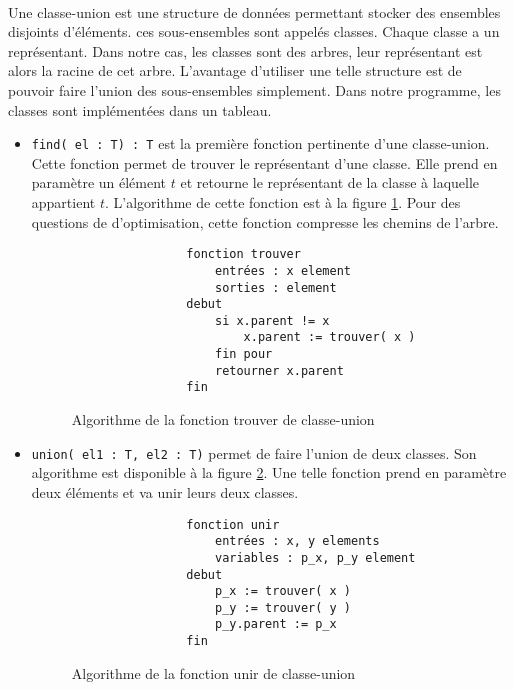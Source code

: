 \documentclass[a4paper]{article}
\begin{document}
		    \paragraph{}{
		    Une classe-union est une structure de données permettant stocker des ensembles disjoints d'éléments. ces sous-ensembles sont 
		    appelés classes. Chaque classe a un représentant. Dans notre cas, les classes sont des arbres, leur représentant est alors
		    la racine de cet arbre. L'avantage d'utiliser une telle structure est de pouvoir faire l'union des
		    sous-ensembles simplement. Dans notre programme, les classes sont implémentées dans un tableau.
		    }
		    \begin{itemize}
			    \item \verb|find( el : T) : T| est la première fonction pertinente d'une classe-union. Cette fonction permet de trouver 
	    	le représentant d'une classe. Elle prend en paramètre un élément $t$ et retourne le représentant de la classe à
	    	laquelle appartient $t$.
	    	L'algorithme de cette fonction est à la figure \ref{algo_find}. Pour des questions de d'optimisation, cette fonction
	    	compresse les chemins de l'arbre.
	    	
	    	\begin{figure}
	    	    \begin{verbatim}
	    	    fonction trouver
	    	        entrées : x element
	    	        sorties : element
	    	    debut
	    	        si x.parent != x
	    	            x.parent := trouver( x )
	    	        fin pour
	    	        retourner x.parent
	    	    fin
	    	    \end{verbatim}
	    	\caption{Algorithme de la fonction trouver de classe-union \label{algo_find}}
	    	\end{figure}
	    	
	    	\item \verb|union( el1 : T, el2 : T)| permet de faire l'union de deux classes. Son algorithme est disponible à la 
	        figure \ref{algo_union}. Une telle fonction prend en paramètre deux éléments et va unir leurs deux classes.

	    	\begin{figure}
	    	    \begin{verbatim}
	    	    fonction unir
	    	        entrées : x, y elements
	    	        variables : p_x, p_y element
	    	    debut
	    	        p_x := trouver( x ) 
	    	        p_y := trouver( y )
	    	        p_y.parent := p_x
	    	    fin
	    	    \end{verbatim}
	    	\caption{Algorithme de la fonction unir de classe-union \label{algo_union}}
	    	\end{figure}
	    	\end{itemize}
		
\end{document}
